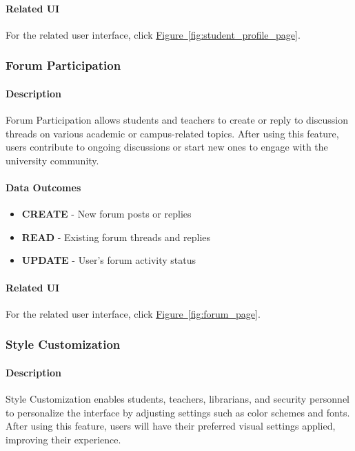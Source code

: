 \documentclass[12pt]{article}
\begin{document}
\paragraph{Related UI}
For the related user interface, click \hyperref[fig:student_profile_page]{Figure~\ref*{fig:student_profile_page}}.

\subsubsection{Forum Participation}

\paragraph{Description}
Forum Participation allows students and teachers to create or reply to discussion threads on various academic or campus-related topics. After using this feature, users contribute to ongoing discussions or start new ones to engage with the university community.

\paragraph{Data Outcomes}
\begin{itemize}
    \item \textbf{CREATE} - New forum posts or replies
    \item \textbf{READ} - Existing forum threads and replies
    \item \textbf{UPDATE} - User's forum activity status
\end{itemize}

\paragraph{Related UI}
For the related user interface, click \hyperref[fig:forum_page]{Figure~\ref*{fig:forum_page}}.

\subsubsection{Style Customization}

\paragraph{Description}
Style Customization enables students, teachers, librarians, and security personnel to personalize the interface by adjusting settings such as color schemes and fonts. After using this feature, users will have their preferred visual settings applied, improving their experience.
\end{document}
